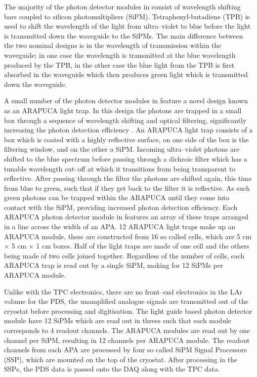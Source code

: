 The majority of the photon detector modules in \protodune{} consist of 
wavelength shifting bars coupled to silicon photomultipliers (SiPM). 
Tetraphenyl-butadiene (TPB) is used to shift the wavelength of the light 
from ultra--violet to blue before the light is transmitted down the waveguide to
the SiPMs. The main difference between the two nominal designs is in the 
wavelength of transmission within the waveguide; in one case the wavelength is 
transmitted at the blue wavelength produced by the TPB, in the other case the 
blue light from the TPB is first absorbed in the waveguide which then produces 
green light which is transmitted down the waveguide.

A small number of the photon detector modules in \protodune{} feature a novel 
design known as an ARAPUCA light trap. In this design the photons are trapped 
in a small box through a sequence of wavelength shifting and optical 
filtering, significantly increasing the photon detection efficiency 
\cite{Segreto:2018jdx}. An ARAPUCA light trap consists of a box which is 
coated with a highly reflective surface, on one side of the box is the 
filtering window, and on the other a SiPM. Incoming ultra--violet photons are 
shifted to the blue spectrum before passing through a dichroic filter which 
has a tunable wavelength cut--off at which it transitions from being 
transparent to reflective. After passing through the filter the photons are 
shifted again, this time from blue to green, such that if they get back to the 
filter it is reflective. As such green photons can be trapped within the 
ARAPUCA until they come into contact with the SiPM, providing increased photon 
detection efficiency. Each ARAPUCA photon detector module in \protodune{} 
features an array of these traps arranged in a line across the width of an 
APA. 12 ARAPUCA light traps make up an ARAPUCA module, these are constructed 
from 16 so called cells, which are 5 cm $\times$ 5 cm $\times$ 1 cm boxes. 
Half of the light traps are made of one cell and the others being made of two 
cells joined together. Regardless of the number of cells, each ARAPUCA trap is 
read out by a single SiPM, making for 12 SiPMs per ARAPUCA module.

Unlike with the TPC electronics, there are no front--end electronics in the LAr
volume for the PDS, the unamplified analogue signals are transmitted out of the
cryostat before processing and digitisation. The light guide based photon 
detector module have 12 SiPMs which are read out in threes such that each 
module corresponds to 4 readout channels. The ARAPUCA modules are read out by
one channel per SiPM, resulting in 12 channels per ARAPUCA module. The readout 
channels from each APA are processed by four so called SiPM Signal Processors 
(SSP), which are mounted on the top of the cryostat. After processing in the 
SSPs, the PDS data is passed onto the DAQ along with the TPC data.

